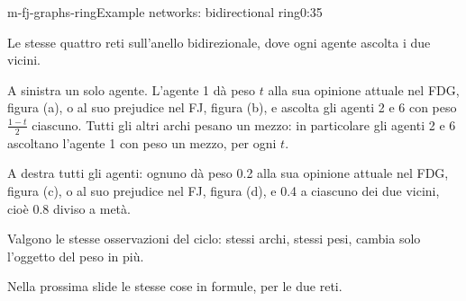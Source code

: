 \begin{slide}{m-fj-graphs-ring}{Example networks: bidirectional ring\nuova}{0:35}
  \begin{discorso}
    \item {\color{blue}Le stesse quattro reti sull'anello bidirezionale, dove ogni agente ascolta i due vicini.}
    \item {\color{blue}A sinistra un solo agente. L'agente 1 dà peso $t$ alla sua opinione attuale nel FDG, figura (a), o al suo prejudice nel FJ, figura (b), e ascolta gli agenti 2 e 6 con peso $\frac{1-t}{2}$ ciascuno. Tutti gli altri archi pesano un mezzo: in particolare gli agenti 2 e 6 ascoltano l'agente 1 con peso un mezzo, per ogni $t$.}
    \item {\color{blue}A destra tutti gli agenti: ognuno dà peso 0.2 alla sua opinione attuale nel FDG, figura (c), o al suo prejudice nel FJ, figura (d), e 0.4 a ciascuno dei due vicini, cioè 0.8 diviso a metà.}
    \item {\color{blue}Valgono le stesse osservazioni del ciclo: stessi archi, stessi pesi, cambia solo l'oggetto del peso in più.}
    \item {\color{blue}Nella prossima slide le stesse cose in formule, per le due reti.}
  \end{discorso}
\end{slide}

